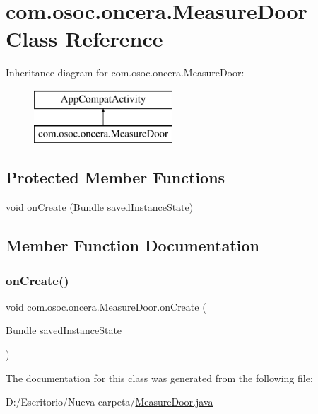 \hypertarget{classcom_1_1osoc_1_1oncera_1_1_measure_door}{}\section{com.\+osoc.\+oncera.\+Measure\+Door Class Reference}
\label{classcom_1_1osoc_1_1oncera_1_1_measure_door}
Inheritance diagram for com.\+osoc.\+oncera.\+Measure\+Door\+:\begin{figure}[H]
\begin{center}
\leavevmode
\includegraphics[height=2.000000cm]{classcom_1_1osoc_1_1oncera_1_1_measure_door}
\end{center}
\end{figure}
\subsection*{Protected Member Functions}
\begin{DoxyCompactItemize}
\item 
void \mbox{\hyperlink{classcom_1_1osoc_1_1oncera_1_1_measure_door_a5f212e31e79f535bdfbb5e276508e6b3}{on\+Create}} (Bundle saved\+Instance\+State)
\end{DoxyCompactItemize}


\subsection{Member Function Documentation}
\mbox{\label{classcom_1_1osoc_1_1oncera_1_1_measure_door_a5f212e31e79f535bdfbb5e276508e6b3}} 
\subsubsection{\texorpdfstring{onCreate()}{onCreate()}}
{\footnotesize\ttfamily void com.\+osoc.\+oncera.\+Measure\+Door.\+on\+Create (\begin{DoxyParamCaption}\item[{Bundle}]{saved\+Instance\+State }\end{DoxyParamCaption})\hspace{0.3cm}{\ttfamily [protected]}}



The documentation for this class was generated from the following file\+:\begin{DoxyCompactItemize}
\item 
D\+:/\+Escritorio/\+Nueva carpeta/\mbox{\hyperlink{_measure_door_8java}{Measure\+Door.\+java}}\end{DoxyCompactItemize}
